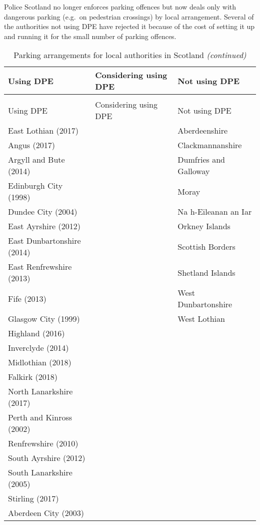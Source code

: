 \documentclass[
  12pt,
]{article}
\begin{document}
Police Scotland no longer enforces parking offences but now deals only with dangerous parking (e.g.~on pedestrian crossings) by local arrangement. Several of the authorities not using DPE have rejected it because of the cost of setting it up and running it for the small number of parking offences.

\begingroup\fontsize{10}{12}\selectfont

\begin{longtable}[t]{lll}
\caption{\label{tab:dpe}Parking arrangements for local authorities in Scotland}\\
\toprule
Using DPE & Considering using DPE & Not using DPE\\
\midrule
\endfirsthead
\caption[]{\label{tab:dpe}Parking arrangements for local authorities in Scotland \textit{(continued)}}\\
\toprule
Using DPE & Considering using DPE & Not using DPE\\
\midrule
\endhead

\endfoot
\bottomrule
\endlastfoot
East Lothian (2017) &  & Aberdeenshire\\
Angus (2017) &  & Clackmannanshire\\
Argyll and Bute (2014) &  & Dumfries and Galloway\\
Edinburgh City (1998) &  & Moray\\
Dundee City (2004) &  & Na h-Eileanan an Iar\\
East Ayrshire (2012) &  & Orkney Islands\\
East Dunbartonshire (2014) &  & Scottish Borders\\
East Renfrewshire (2013) &  & Shetland Islands\\
Fife (2013) &  & West Dunbartonshire\\
Glasgow City (1999) &  & West Lothian\\
Highland (2016) &  & \\
Inverclyde (2014) &  & \\
Midlothian (2018) &  & \\
Falkirk (2018) &  & \\
North Lanarkshire (2017) &  & \\
Perth and Kinross (2002) &  & \\
Renfrewshire (2010) &  & \\
South Ayrshire (2012) &  & \\
South Lanarkshire (2005) &  & \\
Stirling (2017) &  & \\
Aberdeen City (2003) &  & \\*
\end{longtable}
\endgroup{}
\end{document}
